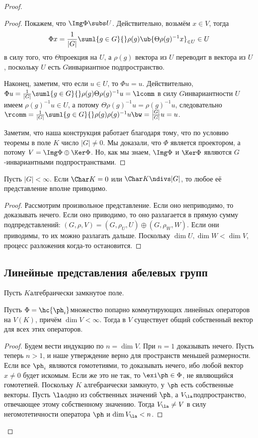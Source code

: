 \documentclass[a4paper]{article}
\newcommand{\sumlg}{\suml{g \in G}{}}
\begin{document}
\begin{proof}
\begin{proof}
Покажем, что $\Img \Phi \subs U$. Действительно, возьмём $x \in V$, тогда
$$
  \Phi x =  \frac{1}{|G|}\sumlg \rho(g)\ub{\Theta \rho(g)^{-1}x}_{\in U} \in U
$$
в силу того, что $\Theta$\т проекция на $U$, а $\rho(g)$
вектора из $U$ переводит в вектора из $U$, поскольку $U$ есть $G$\д инвариантное подпространство.

Наконец, заметим, что если $u \in U$, то $\Phi u = u$. Действительно, $\Phi u =  \frac{1}{|G|}\sumlg
\rho(g)\Theta \rho(g)^{-1} u = \lcomm$ в силу $G$\д инвариантности $U$ имеем $\rho(g)^{-1}u \in U$, а потому
$\Theta \rho(g)^{-1}u = \rho(g)^{-1}u$, следовательно $\rcomm = \frac{1}{|G|}\sumlg \rho(g) \rho(g)^{-1}u \bw=
\frac{|G|}{|G|}u=u$.

Заметим, что наша конструкция работает благодаря тому, что по условию теоремы в  поле $K$ число $|G| \neq 0$.
Мы доказали, что $\Phi$ является проектором, а потому $V = \Img \Phi \oplus \Ker \Phi$. Но, как мы знаем,
$\Img \Phi$ и $\Ker \Phi$ являются $G$-инвариантными подпространствами.
\end{proof}

\begin{theorem}[Машке]
Пусть $|G|<\infty$. Если $\Char K = 0$ или $\Char K \ndivs |G|$, то любое её  представление вполне приводимо.
\end{theorem}
\begin{proof}
Рассмотрим произвольное представление. Если оно неприводимо, то доказывать  нечего. Если оно приводимо, то
оно разлагается в прямую сумму подпредставлений: $(G, \rho, V) = (G, \rho_U, U) \oplus (G, \rho_W, W)$. Если
они приводимы, то их можно разлагать дальше. Поскольку $\dim U, \dim W < \dim V$, процесс разложения когда-то
остановится.
\end{proof}

\subsection{Линейные представления абелевых групп}
Пусть $K$\т алгебраически замкнутое поле.

\begin{theorem}
Пусть $\Phi = \hc{\ph_i}$\т множество попарно коммутирующих линейных операторов  на $V(K)$, причём $\dim V <
\infty$. Тогда в $V$ существует общий собственный вектор для всех этих операторов.
\end{theorem}
\begin{proof}
Будем вести индукцию по $n = \dim V$. При $n=1$ доказывать нечего. Пусть теперь  $n > 1$, и наше утверждение
верно для пространств меньшей размерности. Если все $\ph_i$ являются гомотетиями, то доказывать нечего, ибо
любой вектор $x \neq 0$ будет искомым. Если же это не так, то $\exi \ph \in \Phi$, не являющийся гомотетией.
Поскольку $K$ алгебраически замкнуто, у $\ph$ есть собственные векторы. Пусть $\la$\т одно из собственных
значений $\ph$, а $V_\la$\т подпространство, отвечающее этому собственному значению. Тогда $V_\la \neq V$ в
силу негомотетичности оператора $\ph$ и $\dim V_\la < n$.


\end{proof}
\end{proof}
\end{document}
